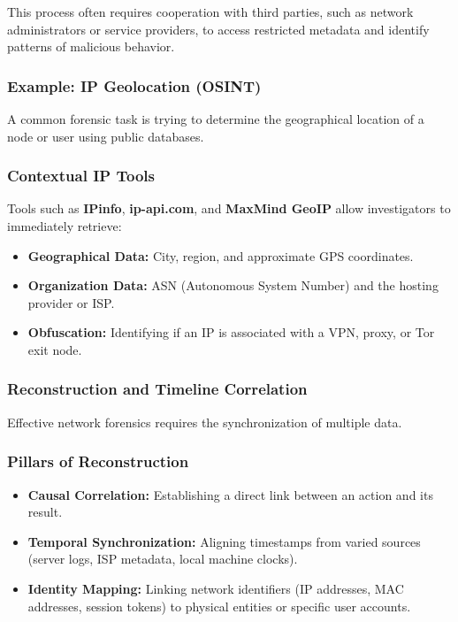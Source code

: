 \noindent
This process often requires cooperation with third parties, such as network administrators or service providers, to access restricted metadata and identify patterns of malicious behavior.

\subsubsection{Example: IP Geolocation (OSINT)}
A common forensic task is trying to determine the geographical location of a node or user using public databases.

\subsubsection*{Contextual IP Tools}
Tools such as \textbf{IPinfo}, \textbf{ip-api.com}, and \textbf{MaxMind GeoIP} allow investigators to immediately retrieve:
\begin{itemize}
    \item \textbf{Geographical Data:} City, region, and approximate GPS coordinates.
    \item \textbf{Organization Data:} ASN (Autonomous System Number) and the hosting provider or ISP.
    \item \textbf{Obfuscation:} Identifying if an IP is associated with a VPN, proxy, or Tor exit node.
\end{itemize}


\subsubsection{Reconstruction and Timeline Correlation}
Effective network forensics requires the synchronization of multiple data.

\subsubsection*{Pillars of Reconstruction}
\begin{itemize}
    \item \textbf{Causal Correlation:} Establishing a direct link between an action  and its result.
    \item \textbf{Temporal Synchronization:} Aligning timestamps from varied sources (server logs, ISP metadata, local machine clocks). 
    \item \textbf{Identity Mapping:} Linking network identifiers (IP addresses, MAC addresses, session tokens) to physical entities or specific user accounts.
\end{itemize}

